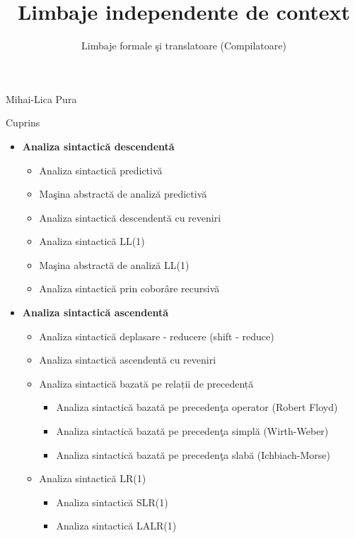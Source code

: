 \documentclass[pdf]{beamer}
\title{Limbaje independente de context}
\subtitle{Limbaje formale şi translatoare (Compilatoare)}
\begin{document}
\begin{frame}
	\titlepage
	
\begin{flushright}
Mihai-Lica Pura\\
\end{flushright}

\end{frame}



\begin{frame}{Cuprins}
\begin{itemize}
\item
\textbf{Analiza sintactică descendentă}
\begin{itemize}
\item
Analiza sintactică predictivă
\item
Maşina abstractă de analiză predictivă
\item
Analiza sintactică descendentă cu reveniri 
\item
Analiza sintactică LL(1)
\item
Maşina abstractă de analiză LL(1)
\item
Analiza sintactică prin coborâre recursivă
\end{itemize}
\item
\textbf{Analiza sintactică ascendentă}
\begin{itemize}
\item
Analiza sintactică deplasare - reducere (shift - reduce)
\item
Analiza sintactică ascendentă cu reveniri

\item
Analiza sintactică bazată pe relații de precedență
\begin{itemize}
\item
Analiza sintactică bazată pe precedenţa operator (Robert Floyd)
\item
Analiza sintactică bazată pe precedenţa simplă (Wirth-Weber)
\item
Analiza sintactică bazată pe precedenţa slabă (Ichbiach-Morse)
\end{itemize}

\item
Analiza sintactică LR(1)
\begin{itemize}
\item
Analiza sintactică SLR(1)
\item
Analiza sintactică LALR(1)
\end{itemize}

\end{itemize}
\end{itemize}
\end{frame}
\end{document}
